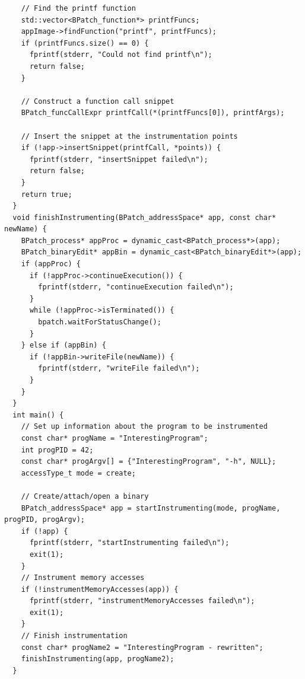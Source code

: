 \begin{lstlisting}
    // Find the printf function
    std::vector<BPatch_function*> printfFuncs;
    appImage->findFunction("printf", printfFuncs);
    if (printfFuncs.size() == 0) {
      fprintf(stderr, "Could not find printf\n");
      return false;
    }

    // Construct a function call snippet
    BPatch_funcCallExpr printfCall(*(printfFuncs[0]), printfArgs);

    // Insert the snippet at the instrumentation points
    if (!app->insertSnippet(printfCall, *points)) {
      fprintf(stderr, "insertSnippet failed\n");
      return false;
    }
    return true;
  }
  void finishInstrumenting(BPatch_addressSpace* app, const char* newName) {
    BPatch_process* appProc = dynamic_cast<BPatch_process*>(app);
    BPatch_binaryEdit* appBin = dynamic_cast<BPatch_binaryEdit*>(app);
    if (appProc) {
      if (!appProc->continueExecution()) {
        fprintf(stderr, "continueExecution failed\n");
      }
      while (!appProc->isTerminated()) {
        bpatch.waitForStatusChange();
      }
    } else if (appBin) {
      if (!appBin->writeFile(newName)) {
        fprintf(stderr, "writeFile failed\n");
      }
    }
  }
  int main() {
    // Set up information about the program to be instrumented
    const char* progName = "InterestingProgram";
    int progPID = 42;
    const char* progArgv[] = {"InterestingProgram", "-h", NULL};
    accessType_t mode = create;

    // Create/attach/open a binary
    BPatch_addressSpace* app = startInstrumenting(mode, progName, progPID, progArgv);
    if (!app) {
      fprintf(stderr, "startInstrumenting failed\n");
      exit(1);
    }
    // Instrument memory accesses
    if (!instrumentMemoryAccesses(app)) {
      fprintf(stderr, "instrumentMemoryAccesses failed\n");
      exit(1);
    }
    // Finish instrumentation
    const char* progName2 = "InterestingProgram - rewritten";
    finishInstrumenting(app, progName2);
  }
\end{lstlisting}
